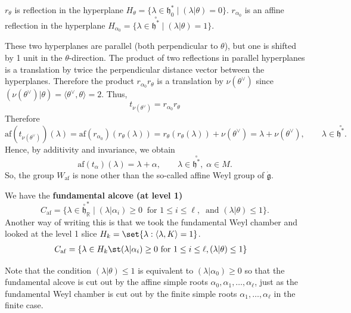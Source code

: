 \documentclass[12pt]{article}
\begin{document}
$r_\theta$ is reflection in the hyperplane $H_\theta = \{\lambda \in \mathfrak{h}_0^* \mid (\lambda|\theta)=0\}$. $r_{\alpha_0}$ is an affine reflection in the hyperplane $H_{\alpha_0} = \{\lambda \in \overset{\circ}{\mathfrak{h}^*} \mid (\lambda|\theta)=1\}$.

These two hyperplanes are parallel (both perpendicular to $ \theta $), but one is shifted by 1 unit in the $\theta$-direction. The product of two reflections in parallel hyperplanes is a translation by twice the perpendicular distance vector between the hyperplanes. Therefore the product $r_{\alpha_0} r_\theta$ is a translation by $\nu(\theta^\vee)$ since $(\nu(\theta^\vee)|\theta) = \langle \theta^\vee, \theta \rangle = 2$. Thus,
\[t_{\nu(\theta^\vee)} = r_{\alpha_0} r_\theta\]
Therefore
\[
    \mathrm{af}(t_{\nu(\theta^\vee)})(\lambda)
    = \mathrm{af}(r_{\alpha_0})(r_\theta(\lambda)) = r_\theta(r_\theta(\lambda)) + \nu(\theta^\vee)
    = \lambda + \nu(\theta^\vee), \qquad \lambda \in \overset{\circ}{\mathfrak{h}^*}.
\]
Hence, by additivity and invariance, we obtain
\begin{equation} \label{6.6.3}
    \mathrm{af}(t_\alpha)(\lambda) = \lambda + \alpha,
    \qquad \lambda \in \overset{\circ}{\mathfrak{h}^*}, \; \alpha \in M.
\end{equation}
So, the group $W_{\mathrm{af}}$ is none other than the so-called affine Weyl group of $\dot{\mathfrak{g}}$.

\begin{definition}
    We have the \textbf{fundamental alcove (at level 1)}
    \[
        C_{\mathrm{af}} = \{ \lambda \in \overset{\circ}{\mathfrak{h}}^*_{\mathbb{R}} \mid
        (\lambda|\alpha_i) \geq 0 \;\; \text{for } 1 \leq i \leq \ell,\;\;
        \text{and } (\lambda|\theta) \leq 1 \}.
    \]
    Another way of writing this is that we took the fundamental Weyl chamber and looked at the level 1 slice $H_k = \set{\lambda : \langle \lambda, K \rangle = 1}$. \begin{align*}
        C_{\mathrm{af}} & = \{\lambda \in H_k \st (\lambda|\alpha_i) \geq 0 \text{ for } 1 \leq i \leq \ell, (\lambda|\theta) \leq 1\}
    \end{align*}
\end{definition}
Note that the condition $(\lambda | \theta ) \leq 1$ is equivalent to $(\lambda | \alpha_0) \geq 0$ so that the fundamental alcove is cut out by the affine simple roots $\alpha_0, \alpha_1, \ldots, \alpha_\ell$, just as the fundamental Weyl chamber is cut out by the finite simple roots $\alpha_1, \ldots, \alpha_\ell$ in the finite case.
\end{document}
